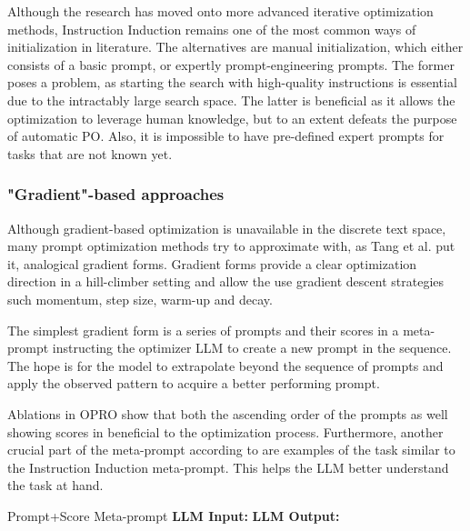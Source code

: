 Although the research has moved onto more advanced iterative optimization methods, Instruction Induction remains one of the 
most common ways of initialization in literature. The alternatives are manual initialization, which 
either consists of a basic prompt, or expertly prompt-engineering prompts. 
The former poses a problem, as starting the search with high-quality instructions 
is essential due to the intractably large search space\cite{opsahlong2024optimizinginstructionsdemonstrationsmultistage}. 
The latter is beneficial as it allows the optimization to leverage human knowledge\cite{guo2024connectinglargelanguagemodels}, but
to an extent defeats the purpose of automatic PO. Also, it is impossible to have pre-defined expert prompts for tasks that are not known yet.

\subsubsection{"Gradient"-based approaches}
Although gradient-based optimization is unavailable in the discrete text space, many prompt optimization methods try to approximate with,
as Tang et al.\cite{tang2024unleashingpotentiallargelanguage} put it, analogical gradient forms. Gradient forms provide a clear
optimization direction in a hill-climber setting and allow the use gradient descent strategies such momentum, step size, warm-up and decay.

The simplest gradient form is a series of prompts and their scores in a meta-prompt instructing the optimizer LLM
to create a new prompt in the sequence. The hope is for the model to extrapolate beyond the sequence of prompts
and apply the observed pattern to acquire a better performing prompt. 

Ablations in OPRO\cite{yang2024largelanguagemodelsoptimizers} show that both the ascending order of the prompts
as well showing scores in beneficial to the optimization process. Furthermore, another crucial part
of the meta-prompt according to\cite{yang2024largelanguagemodelsoptimizers} are examples of the task similar to the
Instruction Induction meta-prompt. This helps the LLM better understand the task at hand. 

\begin{promptbox}
    [label={box:oprometa}]{Prompt+Score Meta-prompt}
    \textbf{LLM Input:} 
    \textbf{LLM Output:}
\end{promptbox}

